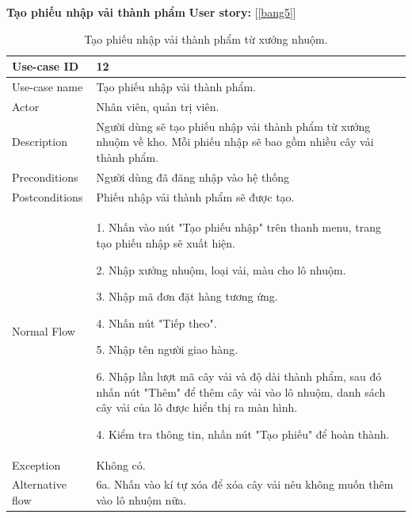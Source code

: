 \newpage
\textbf{Tạo phiếu nhập vải thành phẩm}
\textbf{User story:} [\ref{bang5}]
\begin{table}[!htp]
    \centering
    \begin{tabular}{|m{3cm}|m{10cm}|}
    \hline 
        Use-case ID & 12\\ \hline
        Use-case name & Tạo phiếu nhập vải thành phẩm.\\ \hline
        Actor & Nhân viên, quản trị viên.\\ \hline
        Description & Người dùng sẽ tạo phiếu nhập vải thành phẩm từ xưởng nhuộm về kho. Mỗi phiếu nhập sẽ bao gồm nhiều cây vải thành phẩm.\\ \hline
        Preconditions & Người dùng đã đăng nhập vào hệ thống \\ \hline
        Postconditions & Phiếu nhập vải thành phẩm sẽ được tạo.\\ \hline
        Normal Flow & 
        1. Nhấn vào nút "Tạo phiếu nhập" trên thanh menu, trang tạo phiếu nhập sẽ xuất hiện.\par
        2. Nhập xưởng nhuộm, loại vải, màu cho lô nhuộm.\par
        3. Nhập mã đơn đặt hàng tương ứng.\par
        4. Nhấn nút "Tiếp theo".\par
        5. Nhập tên người giao hàng.\par
        6.  Nhập lần lượt mã cây vải và độ dài thành phẩm, sau đó nhấn nút "Thêm" để thêm cây vải vào lô nhuộm, danh sách cây vải của lô được hiển thị ra màn hình.\par
        4. Kiểm tra thông tin, nhấn nút "Tạo phiếu" để hoàn thành.
        \\ \hline
        Exception & Không có.
        \\ \hline
        Alternative flow & 
        6a. Nhấn vào kí tự xóa để xóa cây vải nêu không muốn thêm vào lô nhuộm nữa.
        \\ 
    \hline 
    \end{tabular}
    \caption{Tạo phiếu nhập vải thành phẩm từ xưởng nhuộm.}
    \label{bang11}
\end{table}


